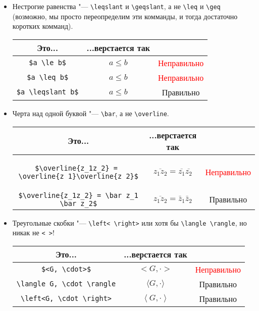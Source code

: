 \documentclass[12pt,a4paper]{book}
\def\ra{\rightarrow}
\def\R{\mathbb{R}}
\newcommand{\ok}{& \textcolor{green!60!black}{Правильно}}
\newcommand{\bad}{& \textcolor{red}{Неправильно}}
\begin{document}
\begin{enumerate}
\begin{itemize}
\begin{center}
\begin{tabular}{|c|c|c|}
\hline \verb'$f\colon \R \ra \R$' & $f\colon\R\ra\R$ \ok \\
\hline
\end{tabular}\end{center}
\item Нестрогие равенства "--- \verb'\leqslant' и \verb'\geqslant', а не \verb'\leq' и \verb'\geq' (возможно, мы просто переопределим эти комманды, и тогда достаточно коротких комманд).
\begin{center}\begin{tabular}{|c|c|c|}
\hline Это... & ...верстается так & \\
\hline \verb'$a \le b$' & $a \le b$ \bad \\
\hline \verb'$a \leq b$' & $a \leq b$ \bad \\
\hline \verb'$a \leqslant b$' & $a \leqslant b$ \ok \\
\hline
\end{tabular}\end{center}
\item Черта над одной буквой "--- \verb'\bar', а не \verb'\overline'.
\begin{center}\begin{tabular}{|c|c|c|}
\hline Это... & ...верстается так & \\
\hline
\begin{minipage}{6cm}
\begin{verbatim}
$\overline{z_1z_2} = 
\overline{z_1}\overline{z_2}$
\end{verbatim}
\end{minipage}
& $\overline{z_1z_2} = \overline{z_1}\overline{z_2}$ \bad \\
\hline \verb'$\overline{z_1z_2} = \bar z_1 \bar z_2$' & $\overline{z_1z_2} = \bar z_1 \bar z_2$ \ok \\
\hline
\end{tabular}\end{center}
\item Треугольные скобки "--- \verb'\left< \right>' или хотя бы \verb'\langle \rangle', но никак не \verb'< >'!
\begin{center}\begin{tabular}{|c|c|c|}
\hline Это... & ...верстается так & \\
\hline \verb'$<G, \cdot>$' & $<G, \cdot>$ \bad \\
\hline \verb'\langle G, \cdot \rangle' & $\langle G, \cdot \rangle$ \ok \\
\hline \verb'\left<G, \cdot \right>' & $\left<G, \cdot \right>$ \ok \\

\end{tabular}
\end{center}
\end{itemize}
\end{enumerate}
\end{document}
